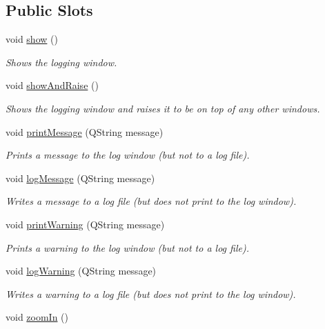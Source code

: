 \subsection*{Public Slots}
\begin{DoxyCompactItemize}
\item 
\hypertarget{class_log_window_adcc6e0cdf92339342b6d564969c9c08a}{void \hyperlink{class_log_window_adcc6e0cdf92339342b6d564969c9c08a}{show} ()}\label{class_log_window_adcc6e0cdf92339342b6d564969c9c08a}

\begin{DoxyCompactList}\small\item\em Shows the logging window. \end{DoxyCompactList}\item 
\hypertarget{class_log_window_a0e2b0c1b3532f71fbff15d038417f108}{void \hyperlink{class_log_window_a0e2b0c1b3532f71fbff15d038417f108}{show\-And\-Raise} ()}\label{class_log_window_a0e2b0c1b3532f71fbff15d038417f108}

\begin{DoxyCompactList}\small\item\em Shows the logging window and raises it to be on top of any other windows. \end{DoxyCompactList}\item 
void \hyperlink{class_log_window_ac001882d402237088e250734cd98838c}{print\-Message} (Q\-String message)
\begin{DoxyCompactList}\small\item\em Prints a message to the log window (but not to a log file). \end{DoxyCompactList}\item 
void \hyperlink{class_log_window_ad22aacde45b6bbb323a7f2a4d8aba94b}{log\-Message} (Q\-String message)
\begin{DoxyCompactList}\small\item\em Writes a message to a log file (but does not print to the log window). \end{DoxyCompactList}\item 
void \hyperlink{class_log_window_a6e465543f32c1b9447ccbb481eee9407}{print\-Warning} (Q\-String message)
\begin{DoxyCompactList}\small\item\em Prints a warning to the log window (but not to a log file). \end{DoxyCompactList}\item 
void \hyperlink{class_log_window_adde69360b38aad4e23ee16100adba710}{log\-Warning} (Q\-String message)
\begin{DoxyCompactList}\small\item\em Writes a warning to a log file (but does not print to the log window). \end{DoxyCompactList}\item 
\hypertarget{class_log_window_af2db9c420af21e1c07b416a6a3a7e5a2}{void \hyperlink{class_log_window_af2db9c420af21e1c07b416a6a3a7e5a2}{zoom\-In} ()}\label{class_log_window_af2db9c420af21e1c07b416a6a3a7e5a2}


\end{DoxyCompactItemize}

